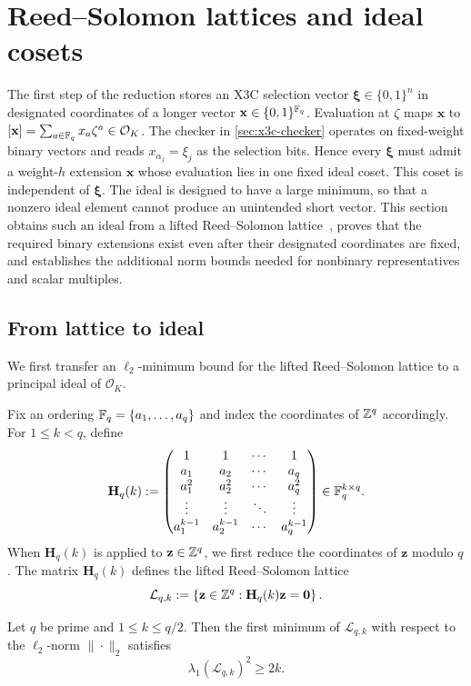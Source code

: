 \section{Reed--Solomon lattices and ideal cosets}
\label{sec:descent}

The first step of the reduction stores an X3C selection vector
$\boldsymbol\xi\in\{0,1\}^n$ in designated coordinates of a longer vector
$\mathbf x\in\{0,1\}^{\mathbb F_q}$.  Evaluation at $\zeta$ maps $\mathbf x$ to
$[\mathbf x]=\sum_{a\in\mathbb F_q}x_a\zeta^a\in\mathcal{O}_K$.  The checker in
\cref{sec:x3c-checker} operates on fixed-weight binary vectors and reads
$x_{\alpha_j}=\xi_j$ as the selection bits.  Hence every $\boldsymbol\xi$ must
admit a weight-$h$ extension $\mathbf x$ whose evaluation lies in one fixed
ideal coset.  This coset is independent of $\boldsymbol\xi$.  The ideal is
designed to have a large minimum, so that a nonzero ideal
element cannot produce an unintended short vector.  This section obtains such
an ideal from a lifted Reed--Solomon lattice~\cite{BennettPeikert23}, proves
that the required binary extensions exist even after their designated
coordinates are fixed, and establishes the additional norm bounds needed for
nonbinary representatives and scalar multiples.

\subsection{From lattice to ideal}

We first transfer an $\ell_2$-minimum bound for the lifted
Reed--Solomon lattice to a principal ideal of $\mathcal{O}_K$.

Fix an ordering $\mathbb F_q=\{a_1,\ldots,a_q\}$ and index the coordinates
of $\mathbb Z^q$ accordingly.  For $1\le k<q$, define
\[
 \mathbf H_q(k):=
 \begin{pmatrix}
  1&1&\cdots&1\\
  a_1&a_2&\cdots&a_q\\
  a_1^2&a_2^2&\cdots&a_q^2\\
  \vdots&\vdots&\ddots&\vdots\\
  a_1^{k-1}&a_2^{k-1}&\cdots&a_q^{k-1}
 \end{pmatrix}
 \in\mathbb F_q^{k\times q}.
\]
When $\mathbf H_q(k)$ is applied to
$\mathbf z\in\mathbb Z^q$, we first reduce the coordinates of $\mathbf z$ modulo
$q$.  The matrix $\mathbf H_q(k)$
defines the lifted Reed--Solomon lattice
\[
 \mathcal L_{q,k}:=\left\{\mathbf z\in\mathbb Z^q:
 \mathbf H_q(k)\mathbf z=\mathbf0\right\}.
\]

\begin{samepage}
\begin{lemma}
\label{lem:rs-minimum}
Let $q$ be prime and $1\le k\le q/2$.  Then the first minimum of
$\mathcal L_{q,k}$ with respect to the $\ell_2$-norm $\|\cdot\|_2$ satisfies
\[
 \lambda_1(\mathcal L_{q,k})^2\ge 2k.
\]
\end{lemma}
\end{samepage}

